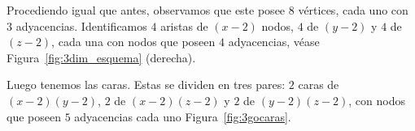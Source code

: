 Procediendo igual que antes, observamos que este posee $8$ vértices, cada uno con $3$ adyacencias. Identificamos $4$ aristas de $(x-2)$ nodos, $4$ de $(y-2)$ y $4$ de $(z-2)$, cada una con nodos que poseen $4$ adyacencias, véase Figura~\ref{fig:3dim_esquema} (derecha).


Luego tenemos las caras. Estas se dividen en tres pares: $2$ caras de $(x-2)(y-2)$, $2$ de $(x-2)(z-2)$ y $2$ de $(y-2)(z-2)$, con nodos que poseen $5$ adyacencias cada uno Figura~\ref{fig:3gocaras}.


